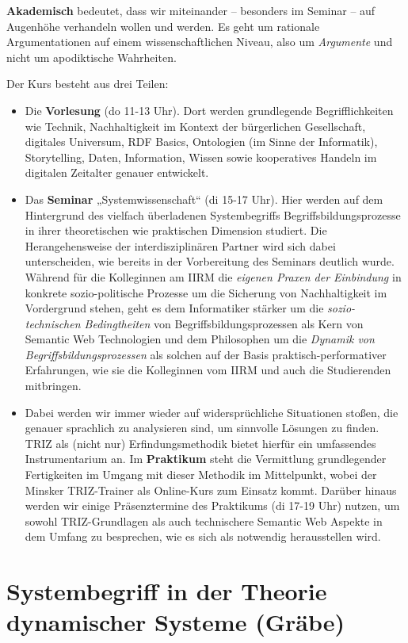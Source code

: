\documentclass[11pt,a4paper]{article}
\begin{document}
\textbf{Akademisch} bedeutet, dass wir miteinander -- besonders im Seminar --
auf Augenhöhe verhandeln wollen und werden. Es geht um rationale
Argumentationen auf einem wissenschaftlichen Niveau, also um \emph{Argumente}
und nicht um apodiktische Wahrheiten.

Der Kurs besteht aus drei Teilen:
\begin{itemize}
\item Die \textbf{Vorlesung} (do 11-13 Uhr). Dort werden grundlegende
  Begriff\-lichkeiten wie Technik, Nachhaltigkeit im Kontext der bürgerlichen
  Gesellschaft, digitales Universum, RDF Basics, Ontologien (im Sinne der
  Informatik), Storytelling, Daten, Information, Wissen sowie kooperatives
  Handeln im digitalen Zeitalter genauer entwickelt.
\item Das \textbf{Seminar} „Systemwissenschaft“ (di 15-17 Uhr). Hier werden
  auf dem Hintergrund des vielfach überladenen Systembegriffs
  Begriffsbildungsprozesse in ihrer theoretischen wie praktischen Dimension
  studiert. Die Herangehensweise der interdisziplinären Partner wird sich
  dabei unterscheiden, wie bereits in der Vorbereitung des Seminars deutlich
  wurde. Während für die Kolleginnen am IIRM die \emph{eigenen Praxen der
    Einbindung} in konkrete sozio-politische Prozesse um die Sicherung von
  Nachhaltigkeit im Vordergrund stehen, geht es dem Informatiker stärker um
  die \emph{sozio-technischen Bedingtheiten} von Begriffsbildungsprozessen als
  Kern von Semantic Web Technologien und dem Philosophen um die \emph{Dynamik
    von Begriffsbildungsprozessen} als solchen auf der Basis
  praktisch-performativer Erfahrungen, wie sie die Kolleginnen vom IIRM und
  auch die Studierenden mitbringen.
\item Dabei werden wir immer wieder auf widersprüchliche Situationen stoßen,
  die genauer sprachlich zu analysieren sind, um sinnvolle Lösungen zu
  finden. TRIZ als (nicht nur) Erfindungsmethodik bietet hierfür ein
  umfassendes Instrumentarium an. Im \textbf{Praktikum} steht die Vermittlung
  grundlegender Fertigkeiten im Umgang mit dieser Methodik im Mittelpunkt,
  wobei der Minsker TRIZ-Trainer als Online-Kurs zum Einsatz kommt.  Darüber
  hinaus werden wir einige Präsenztermine des Praktikums (di 17-19 Uhr)
  nutzen, um sowohl TRIZ-Grundlagen als auch technischere Semantic Web Aspekte
  in dem Umfang zu besprechen, wie es sich als notwendig herausstellen wird.
\end{itemize}

\section{Systembegriff in der Theorie dynamischer Systeme (Gräbe)}
\end{document}
